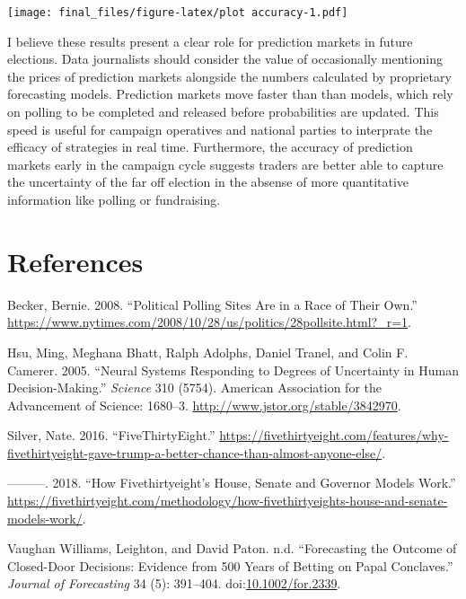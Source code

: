 \documentclass[]{article}
\begin{document}
\texttt{[image: final\_files/figure-latex/plot accuracy-1.pdf]}

I believe these results present a clear role for prediction markets in
future elections. Data journalists should consider the value of
occasionally mentioning the prices of prediction markets alongside the
numbers calculated by proprietary forecasting models. Prediction markets
move faster than than models, which rely on polling to be completed and
released before probabilities are updated. This speed is useful for
campaign operatives and national parties to interprate the efficacy of
strategies in real time. Furthermore, the accuracy of prediction markets
early in the campaign cycle suggests traders are better able to capture
the uncertainty of the far off election in the absense of more
quantitative information like polling or fundraising.

\section*{References}\label{references}

\hypertarget{refs}{}
\hypertarget{ref-becker08}{}
Becker, Bernie. 2008. ``Political Polling Sites Are in a Race of Their
Own.''
\url{https://www.nytimes.com/2008/10/28/us/politics/28pollsite.html?_r=1}.

\hypertarget{ref-camerer05}{}
Hsu, Ming, Meghana Bhatt, Ralph Adolphs, Daniel Tranel, and Colin F.
Camerer. 2005. ``Neural Systems Responding to Degrees of Uncertainty in
Human Decision-Making.'' \emph{Science} 310 (5754). American Association
for the Advancement of Science: 1680--3.
\url{http://www.jstor.org/stable/3842970}.

\hypertarget{ref-silver16why}{}
Silver, Nate. 2016. ``FiveThirtyEight.''
\url{https://fivethirtyeight.com/features/why-fivethirtyeight-gave-trump-a-better-chance-than-almost-anyone-else/}.

\hypertarget{ref-silver18how}{}
---------. 2018. ``How Fivethirtyeight's House, Senate and Governor
Models Work.''
\url{https://fivethirtyeight.com/methodology/how-fivethirtyeights-house-and-senate-models-work/}.

\hypertarget{ref-doi:10.1002ux2ffor.2339}{}
Vaughan Williams, Leighton, and David Paton. n.d. ``Forecasting the
Outcome of Closed-Door Decisions: Evidence from 500 Years of Betting on
Papal Conclaves.'' \emph{Journal of Forecasting} 34 (5): 391--404.
doi:\href{https://doi.org/10.1002/for.2339}{10.1002/for.2339}.
\end{document}
